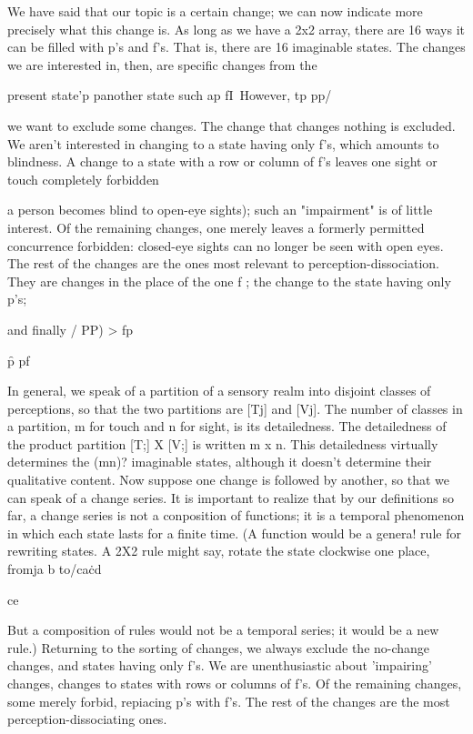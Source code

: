 \documentclass[10pt,twoside]{memoir}
\begin{document}
\begin{enumerate}
{{{{{{{{{{{{{{{We have said that our topic is a certain change; we can now indicate 
more precisely what this change is. As long as we have a 2x2 array, there are 
16 ways it can be filled with p's and f's. That is, there are 16 imaginable 
states. The changes we are interested in, then, are specific changes from the 


present state'p p\to another state such ap fI\ However, 
tp pp/ 

we want to exclude some changes. The change that changes nothing is 
excluded. We aren't interested in changing to a state having only f's, which 
amounts to blindness. A change to a state with a row or column of f's leaves 
one sight or touch completely forbidden {a person becomes blind to 
open-eye sights); such an "impairment" is of little interest. Of the remaining 
changes, one merely leaves a formerly permitted concurrence forbidden: 
closed-eye sights can no longer be seen with open eyes. The rest of the 
changes are the ones most relevant to perception-dissociation. They are 
changes in the place of the one f ; the change to the state having only p's; 


and finally / 
PP) > fp 


\f p pf 


In general, we speak of a partition of a sensory realm into disjoint 
classes of perceptions, so that the two partitions are [Tj] and [Vj]. The 
number of classes in a partition, m for touch and n for sight, is its 
detailedness. The detailedness of the product partition [T;] X [V;] is written 
m x n. This detailedness virtually determines the (mn)? imaginable states, 
although it doesn't determine their qualitative content. Now suppose one 
change is followed by another, so that we can speak of a change series. It is 
important to realize that by our definitions so far, a change series is not a 
conposition of functions; it is a temporal phenomenon in which each state 
lasts for a finite time. (A function would be a genera! rule for rewriting 
states. A 2X2 rule might say, rotate the state clockwise one place, fromja b 
to/ca\. cd 

ce 


But a composition of rules would not be a temporal series; it would be a new 
rule.) Returning to the sorting of changes, we always exclude the no-change 
changes, and states having only f's. We are unenthusiastic about 'impairing' 
changes, changes to states with rows or columns of f's. Of the remaining 
changes, some merely forbid, repiacing p's with f's. The rest of the changes 
are the most perception-dissociating ones. 

}}}}}}}}}}}}}}}}
\end{enumerate}
\end{document}
